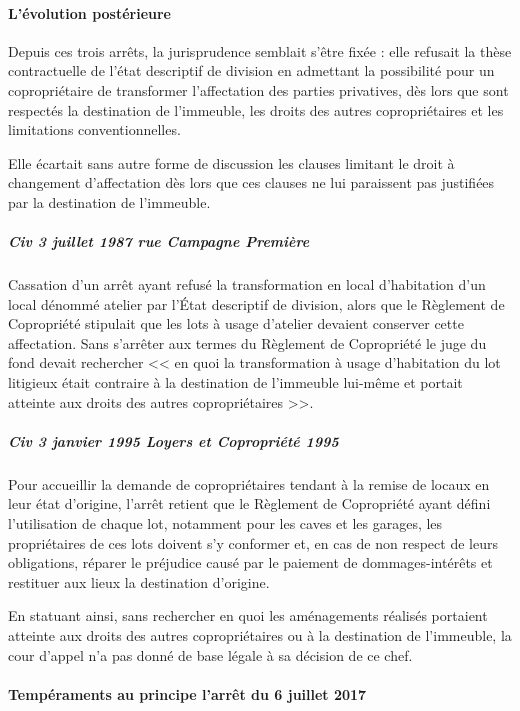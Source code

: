 			\paragraph{L’évolution postérieure}
			
				Depuis ces trois arrêts, la jurisprudence semblait s'être fixée : elle refusait la thèse contractuelle de l’état descriptif de division en admettant la possibilité pour un copropriétaire de transformer l'affectation des parties privatives, dès lors que sont respectés la destination de l'immeuble, les droits des autres copropriétaires et les limitations conventionnelles.
				
				Elle écartait sans autre forme de discussion les clauses limitant le droit à changement d'affectation dès lors que ces clauses ne lui paraissent pas justifiées par la destination de l'immeuble.
				
				\subparagraph{Civ 3 juillet 1987 rue Campagne Première}
				
				Cassation d’un arrêt ayant refusé la transformation en local d'habitation d'un local dénommé atelier par l’État descriptif de division, alors que le Règlement de Copropriété stipulait que les lots à usage d'atelier devaient conserver cette affectation. Sans s'arrêter aux termes du Règlement de Copropriété le juge du fond devait rechercher << en quoi la transformation à usage d'habitation du lot litigieux était contraire à la destination de l'immeuble lui-même et portait atteinte aux droits des autres copropriétaires >>.
				
				\subparagraph{Civ 3 janvier 1995 Loyers et Copropriété 1995 }
				
				Pour accueillir la demande de copropriétaires tendant à la remise de locaux en leur état d'origine, l'arrêt retient que le Règlement de Copropriété ayant défini l'utilisation de chaque lot, notamment pour les caves et les garages, les propriétaires de ces lots doivent s'y conformer et, en cas de non respect de leurs obligations, réparer le préjudice causé par le paiement de dommages-intérêts et restituer aux lieux la destination d'origine.
	
				En statuant ainsi, sans rechercher en quoi les aménagements réalisés portaient atteinte aux droits des autres copropriétaires ou à la destination de l'immeuble, la cour d'appel n'a pas donné de base légale à sa décision de ce chef.
			
			\paragraph{Tempéraments au principe l’arrêt du 6 juillet 2017}
			
